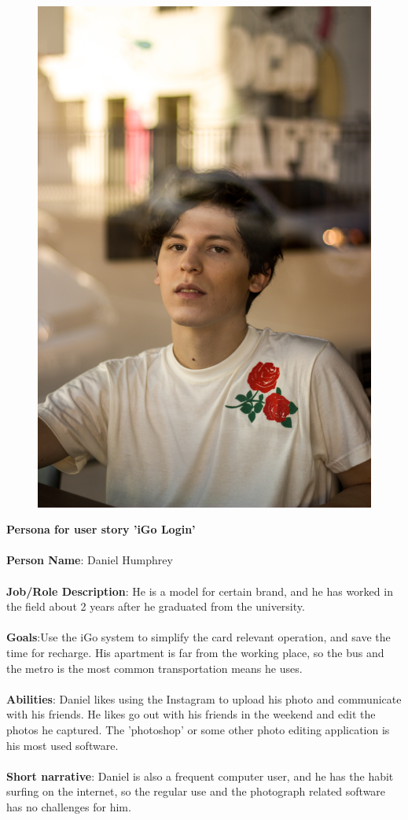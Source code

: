 \documentclass[11pt, english]{report}
\begin{document}
\begin{figure}
\includegraphics[width=0.9\linewidth]{images/man_Model.jpg} 
\label{fig:wrapfig}
\end{figure}

\textbf{Persona for user story 'iGo Login'}
\\\\
\textbf{Person Name}: Daniel Humphrey 
\\\\
\textbf{Job/Role Description}: He is a model for certain brand, and he has worked in the field about 2 years after he graduated from the university.
\\\\
\textbf{Goals}:Use the iGo system to simplify the card relevant operation, and save the time for recharge. His apartment is far from the working place, so the bus and the metro is the most common transportation means he uses.
\\\\
\textbf{Abilities}: Daniel likes using the Instagram to upload his photo and communicate with his friends. He likes go out with his friends in the weekend and edit the photos he captured. The 'photoshop' or some other photo editing application is his most used software.
\\\\
\textbf{Short narrative}: Daniel is also a frequent computer user, and he has the habit surfing on the internet, so the regular use and the photograph related software has no challenges for him. \\
\end{document}

